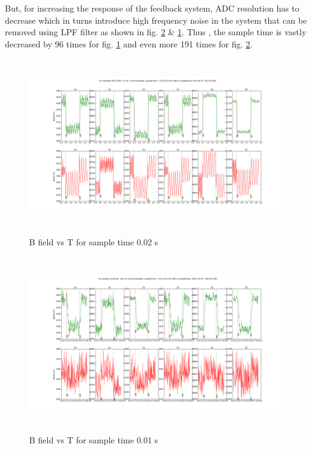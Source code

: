 But, for increasing the response of the feedback system, ADC resolution has to decrease which in turns introduce high frequency noise in the system that can be removed using LPF filter as shown in fig. \ref{fig: fr1_1,2} \& \ref{fig: fr8_1,2}. Thus , the sample time is vastly decreased by 96 times for fig. \ref{fig: fr8_1,2} and even more 191 times for fig. \ref{fig: fr1_1,2}.
\begin{figure}[t]
    \centering
    \captionsetup{justification=centering,margin=1cm}
    \includegraphics[height=3in, width=6in]{Figures/flux_r8.png}
    \caption{B field vs T for sample time 0.02 s\label{fig: fr8_1,2}}
\end{figure}
\begin{figure}[t]
    \centering
    \captionsetup{justification=centering,margin=1cm}
    \includegraphics[height=3in, width=6in]{Figures/flux_r1.png}
    \caption{B field vs T for sample time 0.01 s\label{fig: fr1_1,2}}
\end{figure}